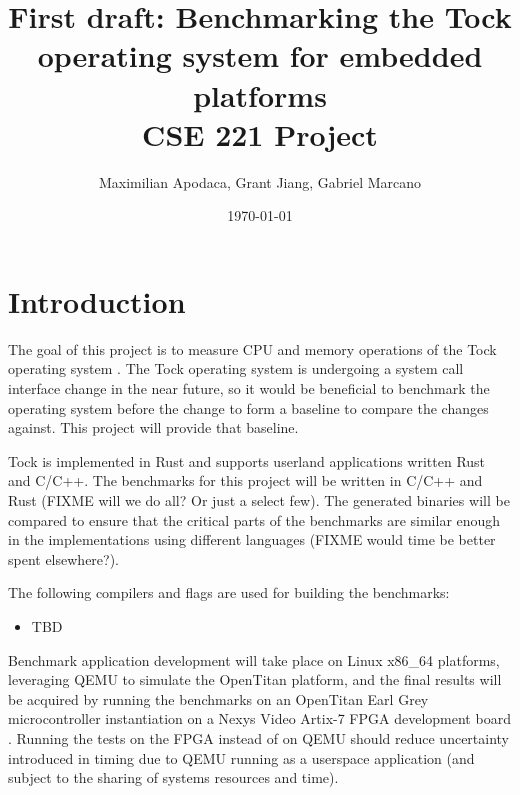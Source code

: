 \documentclass{article}
\title{First draft: Benchmarking the Tock operating system for embedded platforms \\[0.2em]\smaller{} CSE 221 Project}
\author{Maximilian Apodaca, Grant Jiang, Gabriel Marcano}
\date{\today}
\begin{document}
\maketitle

\section{Introduction}

The goal of this project is to measure CPU and memory operations of the Tock operating system \cite{levy17multiprogramming}. The Tock operating system is undergoing a system call interface change in the near future, so it would be beneficial to benchmark the operating system before the change to form a baseline to compare the changes against. This project will provide that baseline. %

Tock is implemented in Rust and supports userland applications written Rust and C/C++. The benchmarks for this project will be written in C/C++ and Rust (FIXME will we do all? Or just a select few). The generated binaries will be compared to ensure that the critical parts of the benchmarks are similar enough in the implementations using different languages (FIXME would time be better spent elsewhere?). %

The following compilers and flags are used for building the benchmarks:
\begin{itemize}
    \item TBD
\end{itemize}

Benchmark application development will take place on Linux x86\_64 platforms, leveraging QEMU to simulate the OpenTitan platform, and the final results will be acquired by running the benchmarks on an OpenTitan Earl Grey microcontroller instantiation on a Nexys Video Artix-7 FPGA development board \cite{opentitangithub}. Running the tests on the FPGA instead of on QEMU should reduce uncertainty introduced in timing due to QEMU running as a userspace application (and subject to the sharing of systems resources and time). %
\end{document}
